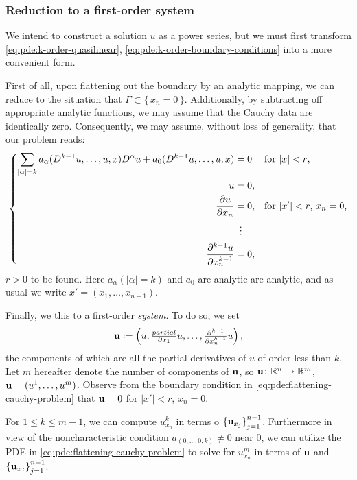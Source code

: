\subsubsection{Reduction to a first-order system}
We intend to construct a solution \(u\) as a power series, but we must
first transform \eqref{eq:pde:k-order-quasilinear},
\eqref{eq:pde:k-order-boundary-conditions} into a more convenient form.

First of all, upon flattening out the boundary by an analytic mapping, we
can reduce to the situation that
\(\Gamma\subset\{\,x_n=0\,\}\). Additionally, by subtracting off
appropriate analytic functions, we may assume that the Cauchy data are
identically zero. Consequently, we may assume, without loss of generality,
that our problem reads:
\begin{equation}
  \label{eq:pde:flattening-cauchy-problem}
  \left\{
    \begin{aligned}
      \sum_{|\alpha|=k}a_\alpha(D^{k-1}u,\dotsc,u,x)D^\alpha u
      +a_0(D^{k-1}u,\dotsc,u,x)&=0&&\text{for \(|x|<r\),}\\
      u&=0,\\
      \frac{\partial u}{\partial x_n}&=0,&&\text{for \(|x'|<r\),
        \(x_n=0\),}\\
      &\vdotswithin{=}\\
      \frac{\partial^{k-1} u}{\partial x_n^{k-1}}&=0,
    \end{aligned}
  \right.
\end{equation}
\(r>0\) to be found. Here \(a_\alpha(|\alpha|=k)\) and \(a_0\) are analytic
are analytic, and as usual we write \(x'=(x_1,\dotsc,x_{n-1})\).

Finally, we this to a first-order \emph{system}. To do so, we set
\[
  \bfu\defeq\left(u,\tfrac{partial}{\partial
      x_1}u,\dotsc,\tfrac{\partial^{k-1}}{\partial x_n^{k-1}}u\right),
\]
the components of which are all the partial derivatives of \(u\) of order
less than \(k\). Let \(m\) hereafter denote the number of components of
\(\mathbf{u}\), so \(\mathbf{u}\colon\mathbb{R}^n\to\mathbb{R}^m\),
\(\mathbf{u}=(u^1,\dotsc,u^m)\). Observe from the boundary condition in
\eqref{eq:pde:flattening-cauchy-problem} that \(\mathbf{u}=0\) for \(|x'|<r\),
\(x_n=0\).

For \(1\leq k\leq m-1\), we can compute \(u_{x_n}^k\) in terms o
\({\{\mathbf{u}_{x_j}\}}_{j=1}^{n-1}\). Furthermore in view of the
noncharacteristic condition \(a_{(0,\dotsc,0,k)}\neq 0\) near \(0\), we can
utilize the PDE in \eqref{eq:pde:flattening-cauchy-problem} to solve for
\(u_{x_n}^m\) in terms of \(\mathbf{u}\) and \({\{\mathbf{u}_{x_j}\}}_{j=1}^{n-1}\).

